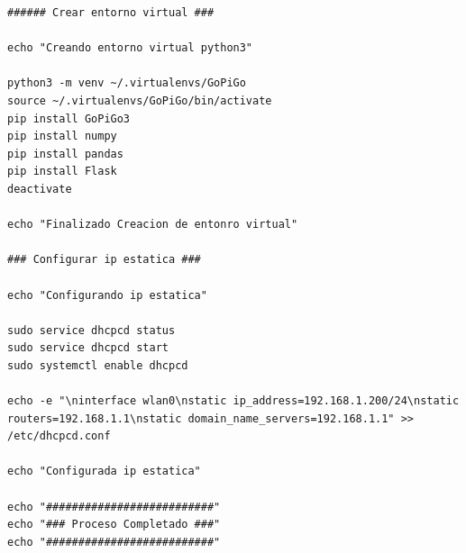 \documentclass{report}
\begin{document}
\begin{enumerate}
\begin{lstlisting}[frame=single,breaklines=true, label=Ejecutable para la instalación y configuración de la Raspberry Pi, caption=Ejecutable para la instalación y configuración de la Raspberry Pi,  captionpos=b]
###### Crear entorno virtual ###

echo "Creando entorno virtual python3"

python3 -m venv ~/.virtualenvs/GoPiGo
source ~/.virtualenvs/GoPiGo/bin/activate
pip install GoPiGo3
pip install numpy
pip install pandas
pip install Flask
deactivate

echo "Finalizado Creacion de entonro virtual"

### Configurar ip estatica ###

echo "Configurando ip estatica"

sudo service dhcpcd status
sudo service dhcpcd start
sudo systemctl enable dhcpcd

echo -e "\ninterface wlan0\nstatic ip_address=192.168.1.200/24\nstatic routers=192.168.1.1\nstatic domain_name_servers=192.168.1.1" >> /etc/dhcpcd.conf

echo "Configurada ip estatica"

echo "##########################"
echo "### Proceso Completado ###"
echo "##########################"


\end{lstlisting}
\end{enumerate}
\end{document}
